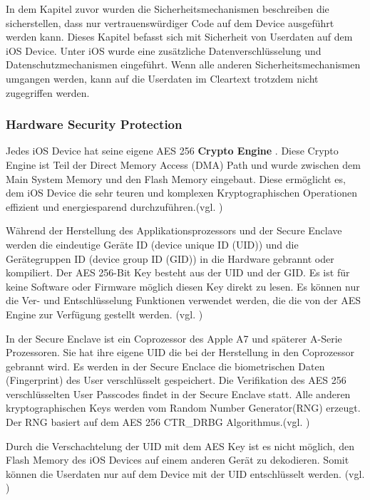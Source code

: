 In dem Kapitel zuvor wurden die Sicherheitsmechanismen beschreiben die sicherstellen, dass nur vertrauenswürdiger Code auf dem Device ausgeführt werden kann. Dieses Kapitel befasst sich mit Sicherheit von Userdaten auf dem iOS Device. Unter iOS wurde eine zusätzliche Datenverschlüsselung und Datenschutzmechanismen eingeführt. Wenn alle anderen Sicherheitsmechanismen umgangen werden, kann auf die Userdaten im Cleartext trotzdem nicht zugegriffen werden.

\subsubsection{Hardware Security Protection}
\label{sec:HardwareSecProtection}

Jedes iOS Device hat seine eigene AES 256 \textbf{Crypto Engine} . Diese Crypto Engine ist Teil der Direct Memory Access (DMA) Path und wurde zwischen dem Main System Memory und den Flash Memory eingebaut. Diese ermöglicht es, dem iOS Device die sehr teuren und komplexen Kryptographischen Operationen effizient und energiesparend durchzuführen.(vgl. \cite{iOSSec[5], iOSSec[2],iOSSec[1], Apple[4], Apple[5], Apple[6], Apple[3]})

Während der Herstellung des Applikationsprozessors und der Secure Enclave werden die eindeutige Geräte ID (device unique ID (UID)) und die Gerätegruppen ID (device group ID (GID)) in die  Hardware gebrannt oder kompiliert.  Der AES 256-Bit Key besteht aus der UID und der GID. Es ist für keine Software oder Firmware möglich diesen Key direkt zu lesen. Es können nur die Ver- und Entschlüsselung Funktionen verwendet werden, die die von der AES Engine zur Verfügung gestellt werden. (vgl. \cite{iOSSec[5], iOSSec[2],iOSSec[1], Apple[4], Apple[5], Apple[6], Apple[3]})

In der Secure Enclave ist ein Coprozessor des Apple A7 und späterer A-Serie Prozessoren. Sie hat ihre eigene UID die bei der Herstellung in den Coprozessor gebrannt wird. Es werden in der Secure Enclace die biometrischen Daten (Fingerprint) des User verschlüsselt gespeichert. Die Verifikation des AES 256 verschlüsselten User Passcodes findet in der Secure Enclave statt. Alle anderen kryptographischen Keys werden vom  Random Number Generator(RNG) erzeugt. Der RNG basiert auf dem AES 256 CTR\_DRBG Algorithmus.(vgl. \cite{iOSSec[5], iOSSec[2],iOSSec[1], Apple[4], Apple[5], Apple[6], Apple[3]})

Durch die Verschachtelung der UID mit dem AES Key ist es nicht möglich, den Flash Memory des iOS Devices auf einem anderen Gerät zu dekodieren. Somit können die Userdaten nur auf dem Device mit der UID entschlüsselt werden. (vgl. \cite{iOSSec[5], iOSSec[2],iOSSec[1], Apple[4], Apple[5], Apple[6], Apple[3]})

